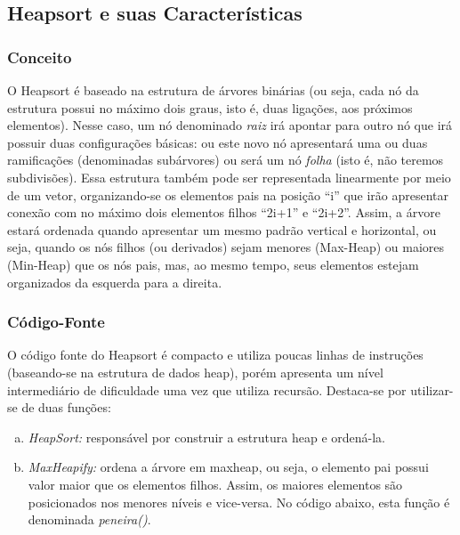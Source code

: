 \documentclass[a4paper, 12pt]{article}
\begin{document}
\subsection{Heapsort e suas Características}

\subsubsection{Conceito} 
\tab{} O Heapsort é baseado na estrutura de árvores binárias (ou seja, cada nó da estrutura possui no máximo dois graus, isto é, duas ligações, aos próximos elementos). Nesse caso, um nó denominado \textit{raiz} irá apontar para outro nó que irá possuir duas configurações básicas: ou este novo nó apresentará uma ou duas ramificações (denominadas subárvores) ou será um nó \textit{folha} (isto é, não teremos subdivisões). Essa estrutura também pode ser representada linearmente por meio de um vetor, organizando-se os elementos pais na posição “i” que irão apresentar conexão com no máximo dois elementos filhos “2i+1” e “2i+2”. Assim, a árvore estará ordenada quando apresentar um mesmo padrão vertical e horizontal, ou seja, quando os nós filhos (ou derivados) sejam menores (Max-Heap) ou maiores (Min-Heap) que os nós pais, mas, ao mesmo tempo, seus elementos estejam organizados da esquerda para a direita.

\subsubsection{Código-Fonte} 
\tab{} O código fonte do Heapsort é compacto e utiliza poucas linhas de instruções (baseando-se na estrutura de dados heap), porém apresenta um nível intermediário de dificuldade uma vez que utiliza recursão. Destaca-se por utilizar-se de duas funções: 
\begin{enumerate}[a)]
   \item \textit{HeapSort:} responsável por construir a estrutura heap e ordená-la. 
   \item \textit{MaxHeapify:} ordena a árvore em maxheap, ou seja, o elemento pai possui valor maior que os elementos filhos. Assim, os maiores elementos são posicionados nos menores níveis e vice-versa. No código abaixo, esta função é denominada \textit{peneira()}.
\end{enumerate}
\end{document}
